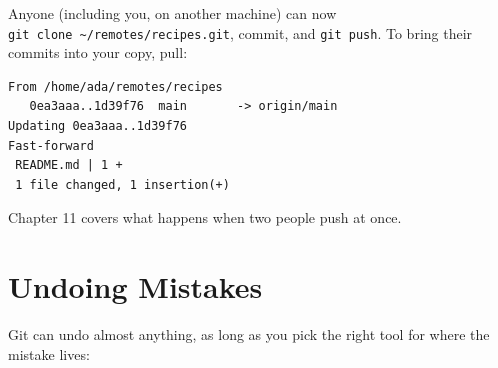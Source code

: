 
Anyone (including you, on another machine) can now \texttt{git\ clone\ \textasciitilde{}/}\allowbreak{}\texttt{remotes/}\allowbreak{}\texttt{recipes.}\allowbreak{}\texttt{git}, commit, and \texttt{git\ push}. To bring their commits into your copy, pull:

\begin{codeblock}

\begin{Shaded}
\begin{Highlighting}[]
\end{Highlighting}
\end{Shaded}

\end{codeblock}

\begin{codeblock}
\begin{Verbatim}[formatcom=\outputstyle]
From /home/ada/remotes/recipes
   0ea3aaa..1d39f76  main       -> origin/main
Updating 0ea3aaa..1d39f76
Fast-forward
 README.md | 1 +
 1 file changed, 1 insertion(+)
\end{Verbatim}
\end{codeblock}

Chapter 11 covers what happens when two people push at once.


\section{Undoing Mistakes}\label{08-git-every-day:undoing-mistakes}

Git can undo almost anything, as long as you pick the right tool for where the mistake lives:

